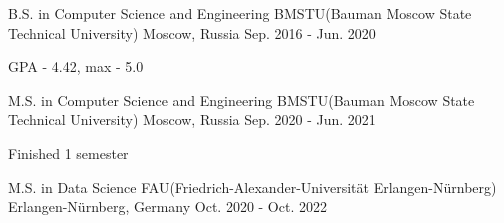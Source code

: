

\begin{cventries}

  \cventry
    {B.S. in Computer Science and Engineering} %
    {BMSTU(Bauman Moscow State Technical University)} %
    {Moscow, Russia} %
    {Sep. 2016 - Jun. 2020} %
    {
      \begin{cvitems} %
        \item {GPA - 4.42, max - 5.0}
      \end{cvitems}
    }

  \cventry
    {M.S. in Computer Science and Engineering} %
    {BMSTU(Bauman Moscow State Technical University)} %
    {Moscow, Russia} %
    {Sep. 2020 - Jun. 2021} %
    {
      \begin{cvitems} %
        \item {Finished 1 semester}
      \end{cvitems}
    }
  \cventry
    {M.S. in Data Science} %
    {FAU(Friedrich-Alexander-Universität Erlangen-Nürnberg)} %
    {Erlangen-Nürnberg, Germany} %
    {Oct. 2020 - Oct. 2022} %
    {}

\end{cventries}
